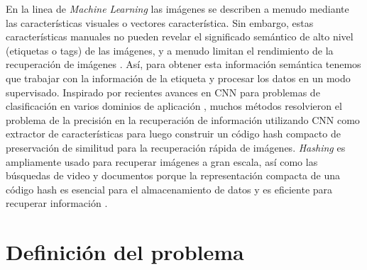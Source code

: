 En la linea de \textit{Machine Learning} las imágenes se describen a menudo mediante las características visuales o vectores característica.  Sin embargo, estas características manuales no pueden revelar el significado semántico de alto nivel (etiquetas o tags) de las imágenes, y a menudo limitan el rendimiento de la recuperación de imágenes \cite{Li:2015:RSS:2881665.2882186}. Así, para obtener esta información semántica tenemos que trabajar con la información de la etiqueta y procesar los datos en un modo supervisado. Inspirado por recientes avances en \acf{CNN} para problemas de clasificación en varios dominios de aplicaci\'on \cite{ImageNet,NIPS2013_5207,LiuWJJC12}, muchos métodos resolvieron el problema de la precisión en la recuperación de informaci\'on utilizando CNN como extractor de características para luego construir un código hash compacto de preservación de similitud para la recuperación rápida de imágenes.   \textit{Hashing} es ampliamente usado para recuperar imágenes a gran escala, así como las búsquedas de video y documentos porque la representación compacta de una código hash es esencial para el almacenamiento de datos y es eficiente para  recuperar información \cite{conf/cvpr/ShenSLS15}. %

\section{Definición del problema}


